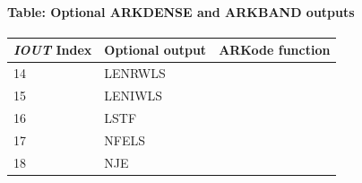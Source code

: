 \documentclass[letterpaper,10pt,english]{sphinxmanual}
\begin{document}
\paragraph{Table: Optional ARKDENSE and ARKBAND outputs}
\label{f_interface/Optional_output:table-optional-arkdense-and-arkband-outputs}\label{f_interface/Optional_output:finterface-dlsiouttable}
\begin{tabulary}{\linewidth}{|L|L|L|}
\hline
\textbf{\relax 
\emph{IOUT} Index
} & \textbf{\relax 
Optional output
} & \textbf{\relax 
ARKode function
}\\\hline

14
 & 
LENRWLS
 & 
{\hyperref[c_interface/User_callable:ARKDlsGetWorkSpace]{}}
\\\hline

15
 & 
LENIWLS
 & 
{\hyperref[c_interface/User_callable:ARKDlsGetWorkSpace]{}}
\\\hline

16
 & 
LSTF
 & 
{\hyperref[c_interface/User_callable:ARKDlsGetLastFlag]{}}
\\\hline

17
 & 
NFELS
 & 
{\hyperref[c_interface/User_callable:ARKDlsGetNumRhsEvals]{}}
\\\hline

18
 & 
NJE
 & 
{\hyperref[c_interface/User_callable:ARKDlsGetNumJacEvals]{}}
\\\hline
\end{tabulary}
\end{document}
